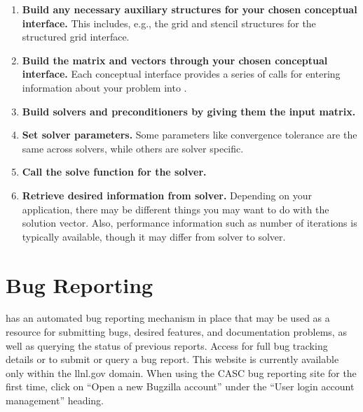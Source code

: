 \begin{enumerate}

\item
{\bf Build any necessary auxiliary structures for your chosen conceptual
interface.} This includes, e.g., 
the grid and stencil structures for the structured grid interface.

\item
{\bf Build the matrix and vectors through your chosen conceptual interface.} Each
conceptual interface 
provides a series of calls for entering information about your problem into
\hypre{}.

\item
{\bf Build solvers and preconditioners by giving them the input matrix.}

\item
{\bf Set solver parameters.} Some parameters like convergence tolerance are the
same across solvers, 
while others are solver specific.

\item
{\bf Call the solve function for the solver.}

\item
{\bf Retrieve desired information from solver.} Depending on your application,
there may be different 
things you may want to do with the solution vector. Also, performance
information such as number of 
iterations is typically available, though it may differ from solver to solver.

\end{enumerate}



\section{Bug Reporting}

\hypre{} has an automated bug reporting mechanism in place that may be used 
as a resource for submitting bugs, desired features, and documentation
problems, as well as querying the status of previous reports.  Access
for full bug tracking details or to submit or query a bug report.
This website is currently available only within the llnl.gov domain.
When using the CASC bug reporting site for the first time, click on
``Open a new Bugzilla account'' under the ``User login account
management'' heading.

